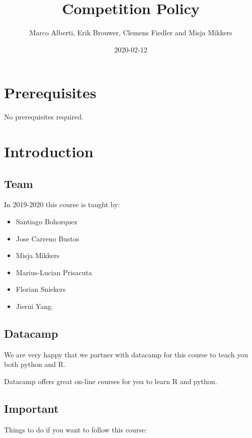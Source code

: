 \documentclass[]{book}
\title{Competition Policy}
\author{Marco Alberti, Erik Brouwer, Clemens Fiedler and Misja Mikkers}
\date{2020-02-12}
\providecommand{\tightlist}{%
  \setlength{\itemsep}{0pt}\setlength{\parskip}{0pt}}
\begin{document}
\maketitle

{
\setcounter{tocdepth}{1}
\tableofcontents
}
\chapter{Prerequisites}\label{prerequisites}

No prerequisites required.

\chapter{Introduction}\label{intro}

\section{Team}\label{team}

In 2019-2020 this course is taught by:

\begin{itemize}
\tightlist
\item
  Santiago Bohorquez
\item
  Jose Carreno Bustos
\item
  Misja Mikkers
\item
  Marius-Lucian Prisacuta
\item
  Florian Sniekers
\item
  Jierui Yang.
\end{itemize}

\section{Datacamp}\label{datacamp}

We are very happy that we partner with datacamp for this course to teach
you both python and R.

Datacamp offers great on-line courses for you to learn R and python.

\section{Important}\label{important}

Things to do if you want to follow this course:
\end{document}
